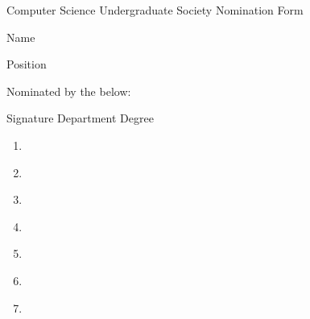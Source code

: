 \documentclass[fontsize=11]{scrartcl}
\begin{document}
\begin{center}
	\huge Computer Science Undergraduate Society Nomination Form
\end{center}

\begin{Form}

	Name \vspace{.5em} \\  \TextField[width=5in]{}
   
   \vspace{1.5em}
   
   Position \vspace{.5em} \\ \TextField[width=5in]{}
   
   \vspace{5em}
   
   Nominated by the below:
   
   
   \begin{center}
		   	Signature \hspace{.8in} Department \hspace{.3in} Degree
    \begin{enumerate}
    	    \item \makebox[2in]{\hrulefill}  \makebox[1in]{\hrulefill}  \makebox[1in]{\hrulefill}  \\ 
    	    
    	    \item \makebox[2in]{\hrulefill}  \makebox[1in]{\hrulefill}  \makebox[1in]{\hrulefill}  \\ 
    	    
    	    \item \makebox[2in]{\hrulefill}  \makebox[1in]{\hrulefill}  \makebox[1in]{\hrulefill}  \\ 
    	    
    	    \item \makebox[2in]{\hrulefill}  \makebox[1in]{\hrulefill}  \makebox[1in]{\hrulefill}  \\ 
    	    
    	    \item \makebox[2in]{\hrulefill}  \makebox[1in]{\hrulefill}  \makebox[1in]{\hrulefill}  \\ 
    	    
    	    \item \makebox[2in]{\hrulefill}  \makebox[1in]{\hrulefill}  \makebox[1in]{\hrulefill}  \\ 
    	    
    	    \item \makebox[2in]{\hrulefill}  \makebox[1in]{\hrulefill}  \makebox[1in]{\hrulefill}  \\ 
    	    

\end{enumerate}
\end{center}
\end{Form}
\end{document}
